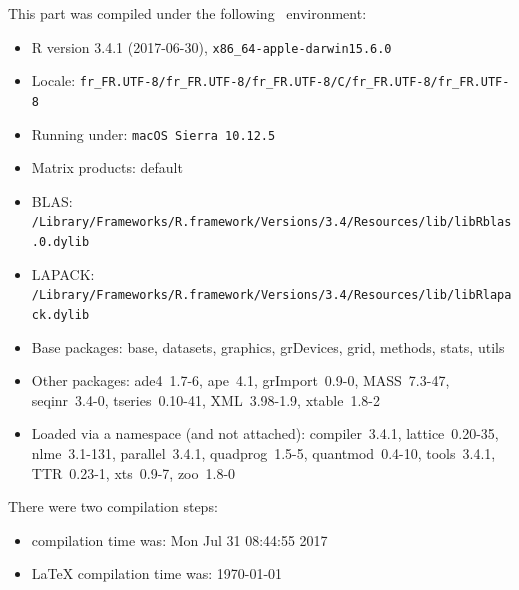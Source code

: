\documentclass{article}
\begin{document}
\begin{scriptsize}

This part was compiled under the following \Rlogo{}~environment:

\begin{itemize}\raggedright
  \item R version 3.4.1 (2017-06-30), \verb|x86_64-apple-darwin15.6.0|
  \item Locale: \verb|fr_FR.UTF-8/fr_FR.UTF-8/fr_FR.UTF-8/C/fr_FR.UTF-8/fr_FR.UTF-8|
  \item Running under: \verb|macOS Sierra 10.12.5|
  \item Matrix products: default
  \item BLAS: \verb|/Library/Frameworks/R.framework/Versions/3.4/Resources/lib/libRblas.0.dylib|
  \item LAPACK: \verb|/Library/Frameworks/R.framework/Versions/3.4/Resources/lib/libRlapack.dylib|
  \item Base packages: base, datasets, graphics, grDevices, grid,
    methods, stats, utils
  \item Other packages: ade4~1.7-6, ape~4.1, grImport~0.9-0,
    MASS~7.3-47, seqinr~3.4-0, tseries~0.10-41, XML~3.98-1.9,
    xtable~1.8-2
  \item Loaded via a namespace (and not attached): compiler~3.4.1,
    lattice~0.20-35, nlme~3.1-131, parallel~3.4.1, quadprog~1.5-5,
    quantmod~0.4-10, tools~3.4.1, TTR~0.23-1, xts~0.9-7, zoo~1.8-0
\end{itemize}
There were two compilation steps:

\begin{itemize}
  \item \Rlogo{} compilation time was: Mon Jul 31 08:44:55 2017
  \item \LaTeX{} compilation time was: \today
\end{itemize}

\end{scriptsize}



\clearpage
{}


\end{document}

